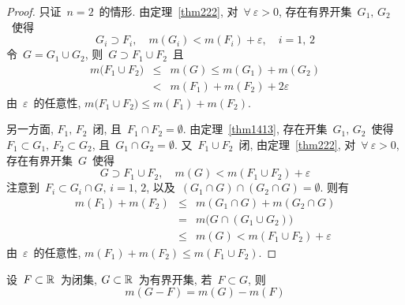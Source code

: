 \begin{proof}
只证~$n = 2$~的情形. 由定理~\ref{thm222}, 对~$\forall~\varepsilon > 0$,
存在有界开集~$G_1,\,G_2$~使得
\[
G_i \supset F_i, \quad m(G_i) < m(F_i) + \varepsilon, \quad i =1,\,2
\]
令~$G = G_1 \cup G_2$, 则~$G \supset F_1 \cup F_2$~且
\begin{eqnarray*}
m\big(F_1 \cup F_2\big) &\leqslant& m(G) \leqslant m(G_1) + m(G_2) \\
&<& m(F_1)+m(F_2) + 2\varepsilon
\end{eqnarray*}
由~$\varepsilon$~的任意性, $m\big(F_1 \cup F_2 \big) \leqslant  m(F_1)+m(F_2)$.

另一方面, $F_1,\,F_2$~闭, 且~$F_1 \cap F_2 = \emptyset$. 由定理~\ref{thm1413},
存在开集~$G_1,\,G_2$~使得~$F_1 \subset G_1, \, F_2 \subset G_2$, 且~$G_1 \cap G_2 =
\emptyset$. 又~$F_1 \cup F_2$~闭, 由定理~\ref{thm222}, 对~$\forall~\varepsilon > 0$,
存在有界开集~$G$~使得
\[
G \supset F_1 \cup F_2,\quad m(G) < m(F_1 \cup F_2) + \varepsilon
\]
注意到~$F_i \subset G_i \cap G,\,i=1,\,2$, 以及~$(G_1 \cap G) \cap (G_2 \cap G)
= \emptyset$. 则有
\begin{eqnarray*}
m(F_1) + m(F_2) &\leqslant& m(G_1 \cap G) + m(G_2 \cap G) \\
&=& m\big(G \cap (G_1 \cup G_2)\big) \\
&\leqslant& m(G) < m(F_1 \cup F_2) + \varepsilon
\end{eqnarray*}
由~$\varepsilon$~的任意性, $m(F_1)+m(F_2) \leqslant  m(F_1 \cup F_2)$.
\end{proof}

\begin{theorem} \label{thm223}
设~$F\subset \mathbb{R}$~为闭集, $G \subset \mathbb{R}$~为有界开集, 若~$F \subset G$, 则
\[
m(G-F) = m(G) - m(F)
\]
\end{theorem}

